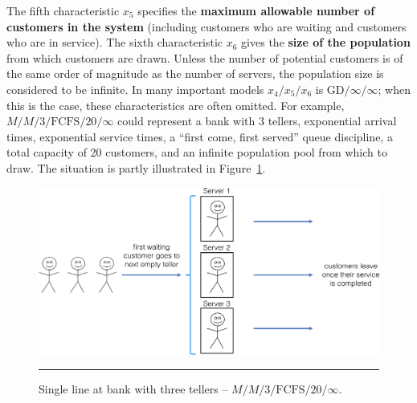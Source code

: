 \newl
The fifth characteristic $x_5$ specifies the \textbf{maximum allowable number of customers in the system} (including customers who are waiting and customers who are in service). The sixth characteristic $x_6$ gives the \textbf{size of the population} from which customers are drawn. Unless
the number of potential customers is of the same order of magnitude as the number of servers, the population size is considered to be infinite. \newl In many important models $x_4/x_5/x_6$ is $\textrm{GD}/\infty/\infty$; when this is the case, these characteristics are often omitted.  For example, $M/M/3/\textrm{FCFS}/20/\infty$ could represent a bank with 3 tellers, exponential arrival times, exponential service times, a ``first come, first served'' queue discipline, a total capacity of 20 customers, and an infinite population pool from which to draw. The situation is partly illustrated in Figure~\ref{fig:1}.
\begin{figure}[!t]
	\centering
		\includegraphics[width=\textwidth]{images/QSD/fig1Queue.png}
	\caption[\small Single line at bank with three tellers]{\small Single line at bank with three tellers -- $M/M/3/\textrm{FCFS}/20/\infty$.}
	\label{fig:1}\hrule
\end{figure}
\vfill


